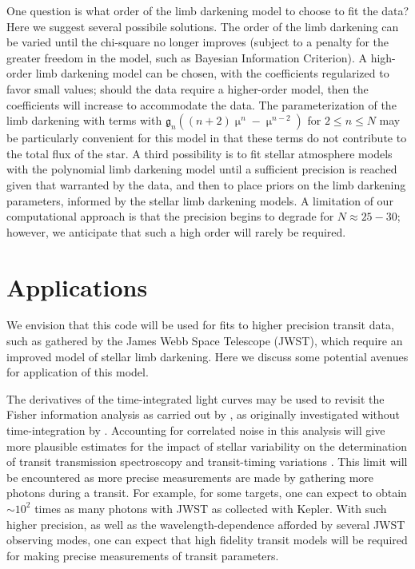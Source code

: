 \documentclass[modern]{aastex61}
\begin{document}
One question is what order of the limb darkening model to choose to
fit the data?  Here we suggest several possibile solutions.  The order of the
limb darkening can be varied until the chi-square no longer improves (subject
to a penalty for the greater freedom in the model, such as Bayesian Information
Criterion).  A high-order limb darkening model can be chosen, with the
coefficients regularized to favor small values;  should the data require
a higher-order model, then the coefficients will increase to accommodate
the data.  The parameterization of the limb darkening with terms with
$\mathfrak{g}_n ((n+2)\upmu^n-\upmu^{n-2})$ for $2 \le n \le N$ may be particularly
convenient for this model in that these terms do not contribute to the
total flux of the star.  A third possibility is to fit stellar atmosphere
models with the polynomial limb darkening model until a sufficient precision
is reached given that warranted by the data, and then to place priors
on the limb darkening parameters, informed by the stellar limb darkening
models.  A limitation of our computational approach is that the precision
begins to degrade for $N \approx 25-30$; however, we anticipate that such
a high order will rarely be required.


\section{Applications}

We envision that this code will be used for fits to higher precision
transit data, such as gathered by the James Webb Space Telescope (JWST), 
which require an improved model of stellar limb darkening.  Here we discuss 
some potential avenues for application of this model.

The derivatives of the time-integrated light curves may be used to revisit the
Fisher information analysis as carried out by \citet{Price2014}, as originally
investigated without time-integration by \citet{Carter2008}.  Accounting
for correlated noise in this analysis will give more plausible estimates
for the impact of stellar variability on the determination of transit
transmission spectroscopy and transit-timing variations \citep{ForemanMackey2017}.  
This limit will be encountered as more precise measurements are made by gathering 
more photons during a transit.  For example, for some targets, one can expect to 
obtain $\sim 10^2$ times as many photons with JWST as collected with Kepler.
With such higher precision, as well as the wavelength-dependence afforded
by several JWST observing modes, one can expect that high fidelity transit
models will be required for making precise measurements of transit parameters.
\end{document}
